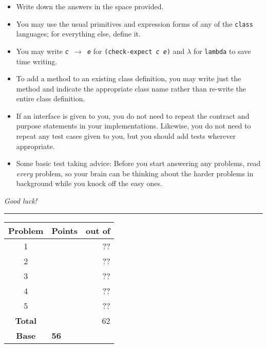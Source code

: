 \documentclass[12pt]{article}                   %
\newcommand\code[1]{\texttt{#1}}
\begin{document}
\noindent\begin{minipage}{7cm}\sloppy
\begin{itemize}
\item Write down the answers in the space provided.

\item You may use the usual primitives and expression forms of any of
  the \code{class} languages; for everything else, define it.

\item You may write {\tt {\slshape c} $\rightarrow$ {\slshape e}} for
  {\tt (check-expect {\slshape c e})} and $\lambda$ for
  \code{lambda} to save time writing.

\item To add a method to an existing class definition, you
  may write just the method and indicate the appropriate class name
  rather than re-write the entire class definition.

\item If an interface is given to you, you do not need to repeat the
  contract and purpose statements in your implementations.  Likewise,
  you do not need to repeat any test cases given to you, but you
  should add tests wherever appropriate.


\item Some basic test taking advice: Before you start answering
any problems, read \emph{every} problem, so your brain can be thinking
about the harder problems in background while you knock off the easy ones.
\end{itemize}

\bigskip

\emph{Good luck!}
\end{minipage}\hfil\begin{minipage}[t]{6cm}
\rule{1cm}{0pt}\begin{tabular}{|c|l|@{/}r|}
\hline
{\bf Problem} & Points & out of \\ \hline
1 & & ??\\ \hline
2 & & ??\\ \hline
3 & & ??\\ \hline
4 & & ??\\ \hline
5 & & ??\\ \hline
{\bf Total} & & 62 \\ \hline
{\bf Base}  & \multicolumn{2}{l|}{{\bf 56}} \\ \hline
\end{tabular}
\end{minipage}
\end{document}
